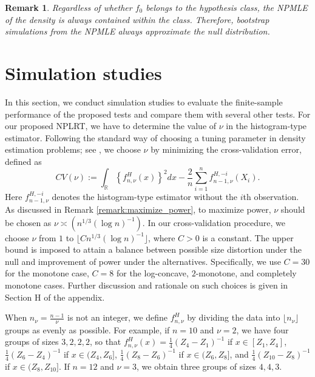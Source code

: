 \documentclass[12pt,letterpaper, twoside, openany]{article}
\theoremstyle{plain}
\newtheorem{remark}[theorem]{Remark}
\begin{document}
		
\begin{remark}
    Regardless of whether $f_0$ belongs to the hypothesis class, the NPMLE of the density is always contained within the class. Therefore, bootstrap simulations from the NPMLE always approximate the null distribution.
\end{remark}


\section{Simulation studies}\label{sect:simulation}
In this section, we conduct simulation studies to evaluate the finite-sample performance of the proposed tests and compare them with several other tests. For our proposed NPLRT, we have to determine the value of $\nu$ in the histogram-type estimator. Following the standard way of choosing a tuning parameter in density estimation problems; see \cite{wasserman2006all},  we choose $\nu$ by minimizing the cross-validation error, defined as
\begin{equation*}
    CV(\nu) := \int_{\mathbb{R}} \left\{f^H_{n,\nu}(x)\right\}^2 dx - \frac{2}{n}\sum^n_{i=1} f^{H,-i}_{n-1,\nu}(X_i).
\end{equation*}
Here $f^{H,-i}_{n-1,\nu}$ denotes the histogram-type estimator without the $i$th observation. As discussed in Remark \ref{remark:maximize_power}, to maximize power, $\nu$ should be chosen as $\nu \asymp(n^{1/3} (\log n)^{-1})$. In our cross-validation procedure, we choose $\nu$ from $1$ to $\lfloor C n^{1/3}(\log n)^{-1} \rfloor$, where $C > 0$ is a constant. The upper bound is imposed to attain a balance between possible size distortion under the null and improvement of power under the alternatives.  Specifically, we use $C = 30$ for the monotone case, $C = 8$ for the log-concave, $2$-monotone, and completely monotone cases.  Further discussion and rationale on such choices is given in Section H of the appendix.

When $n_\nu = \frac{n - 1}{\nu}$ is not an integer, we define $f^H_{n,\nu}$ by dividing the data into $\lfloor n_\nu \rfloor$ groups as evenly as possible. For example, if $n = 10$ and $\nu = 2$, we have four groups of sizes $3, 2, 2, 2$, so that $f^H_{n,\nu}(x) = \frac{1}{4}(Z_4 - Z_1)^{-1}$ if $x \in [Z_1, Z_4]$, $\frac{1}{4}(Z_6 - Z_4)^{-1}$ if $x \in (Z_4, Z_6]$, $\frac{1}{4}(Z_8 - Z_6)^{-1}$ if $x \in (Z_6, Z_8]$, and $\frac{1}{4}(Z_{10} - Z_8)^{-1}$ if $x \in (Z_8, Z_{10}]$. If $n = 12$ and $\nu = 3$, we obtain three groups of sizes $4, 4, 3$.
\end{document}
